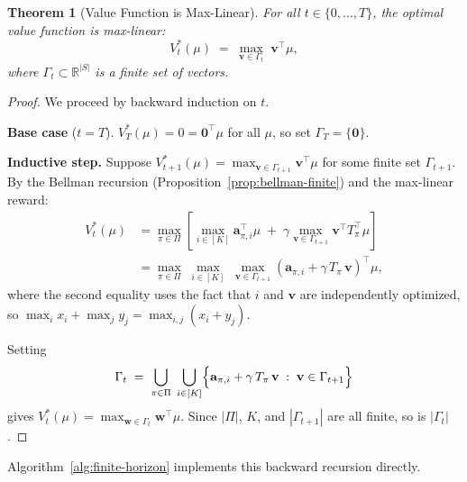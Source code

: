 \documentclass{article}
\newtheorem{theorem}{Theorem}
\begin{document}
\begin{theorem}[Value Function is Max-Linear]\label{thm:finite-horizon}
For all $t \in \{0,\ldots,T\}$, the optimal value function is max-linear:
\[
    V_t^*(\mu) \;=\; \max_{\mathbf{v} \in \Gamma_t}\; \mathbf{v}^\top \mu,
\]
where $\Gamma_t \subset \mathbb{R}^{|S|}$ is a finite set of vectors.
\end{theorem}

\begin{proof}
We proceed by backward induction on $t$.

\medskip\noindent
\textbf{Base case} ($t = T$). $V_T^*(\mu) = 0 = \mathbf{0}^\top\mu$ for all $\mu$, 
so set $\Gamma_T = \{\mathbf{0}\}$.

\medskip\noindent
\textbf{Inductive step.} Suppose $V_{t+1}^*(\mu) = \max_{\mathbf{v} \in \Gamma_{t+1}} 
\mathbf{v}^\top\mu$ for some finite set $\Gamma_{t+1}$.  By the Bellman recursion 
(Proposition~\ref{prop:bellman-finite}) and the max-linear reward:
\begin{align*}
    V_t^*(\mu) 
    &= \max_{\pi \in \Pi}\left[
        \max_{i \in [K]} \mathbf{a}_{\pi,i}^\top\mu 
        \;+\; \gamma \max_{\mathbf{v} \in \Gamma_{t+1}} \mathbf{v}^\top T_\pi^\top\mu
    \right] \\
    &= \max_{\pi \in \Pi}\;
       \max_{i \in [K]}\;
       \max_{\mathbf{v} \in \Gamma_{t+1}}
       \left(\mathbf{a}_{\pi,i} + \gamma\, T_\pi\,\mathbf{v}\right)^\top\!\mu,
\end{align*}
where the second equality uses the fact that $i$ and $\mathbf{v}$ are 
independently optimized, so
$\max_i x_i + \max_j y_j = \max_{i,j}(x_i + y_j)$.

Setting
\[
    \Gamma_t 
    \;=\; \bigcup_{\pi \in \Pi}\;\bigcup_{i \in [K]}
          \Bigl\{\mathbf{a}_{\pi,i} + \gamma\,T_\pi\,\mathbf{v}
                 \;:\; \mathbf{v} \in \Gamma_{t+1}\Bigr\}
\]
gives $V_t^*(\mu) = \max_{\mathbf{w} \in \Gamma_t}\mathbf{w}^\top\mu$.
Since $|\Pi|$, $K$, and $|\Gamma_{t+1}|$ are all finite, so is $|\Gamma_t|$.
\end{proof}

Algorithm~\ref{alg:finite-horizon} implements this backward recursion directly.
\end{document}
